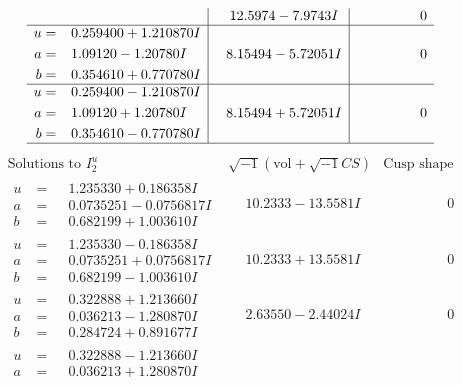 \documentclass[1p]{elsarticle_modified}
\theoremstyle{definition}
\newcommand{\I}{\sqrt{-1}}
\begin{document}
$$\begin{array}{c|c|c}
 & \phantom{-}12.5974 - 7.9743 I & \phantom{-0.000000 } 0 \\ \hline\begin{aligned}
u &= \phantom{-}0.259400 + 1.210870 I \\
a &= \phantom{-}1.09120 - 1.20780 I \\
b &= \phantom{-}0.354610 + 0.770780 I\end{aligned}
 & \phantom{-}8.15494 - 5.72051 I & \phantom{-0.000000 } 0 \\ \hline\begin{aligned}
u &= \phantom{-}0.259400 - 1.210870 I \\
a &= \phantom{-}1.09120 + 1.20780 I \\
b &= \phantom{-}0.354610 - 0.770780 I\end{aligned}
 & \phantom{-}8.15494 + 5.72051 I & \phantom{-0.000000 } 0\\
 \hline 
 \end{array}$$\newpage$$\begin{array}{c|c|c}  
\text{Solutions to }I^u_{2}& \I (\text{vol} + \sqrt{-1}CS) & \text{Cusp shape}\\
 \hline 
\begin{aligned}
u &= \phantom{-}1.235330 + 0.186358 I \\
a &= \phantom{-}0.0735251 - 0.0756817 I \\
b &= \phantom{-}0.682199 + 1.003610 I\end{aligned}
 & \phantom{-}10.2333 - 13.5581 I & \phantom{-0.000000 } 0 \\ \hline\begin{aligned}
u &= \phantom{-}1.235330 - 0.186358 I \\
a &= \phantom{-}0.0735251 + 0.0756817 I \\
b &= \phantom{-}0.682199 - 1.003610 I\end{aligned}
 & \phantom{-}10.2333 + 13.5581 I & \phantom{-0.000000 } 0 \\ \hline\begin{aligned}
u &= \phantom{-}0.322888 + 1.213660 I \\
a &= \phantom{-}0.036213 - 1.280870 I \\
b &= \phantom{-}0.284724 + 0.891677 I\end{aligned}
 & \phantom{-}2.63550 - 2.44024 I & \phantom{-0.000000 } 0 \\ \hline\begin{aligned}
u &= \phantom{-}0.322888 - 1.213660 I \\
a &= \phantom{-}0.036213 + 1.280870 I \\

\end{aligned}
\end{array}$$
\end{document}
